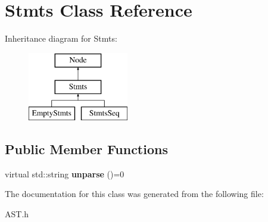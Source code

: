 \hypertarget{classStmts}{\section{Stmts Class Reference}
\label{classStmts}
}
Inheritance diagram for Stmts\-:\begin{figure}[H]
\begin{center}
\leavevmode
\includegraphics[height=3.000000cm]{classStmts}
\end{center}
\end{figure}
\subsection*{Public Member Functions}
\begin{DoxyCompactItemize}
\item 
\hypertarget{classStmts_a9967fb1509f331485ba359cd8745fc82}{virtual std\-::string {\bfseries unparse} ()=0}\label{classStmts_a9967fb1509f331485ba359cd8745fc82}

\end{DoxyCompactItemize}


The documentation for this class was generated from the following file\-:\begin{DoxyCompactItemize}
\item 
A\-S\-T.\-h\end{DoxyCompactItemize}
